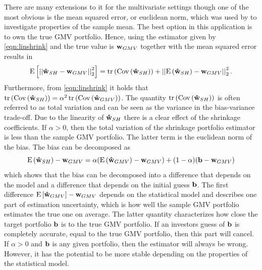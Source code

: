 \documentclass[12pt, oneside]{book}\usepackage{knitr}
\begin{document}
There are many extensions to it for the multivariate settings though one of the most obvious is the mean squared error, or euclidean norm, which was used by 
\citet{stein1956} to investigate properties of the sample mean.  
The best option in this application is to own the true GMV portfolio.
Hence, using the estimator given by \eqref{eqn:linshrink} and the true value is $\mathbf{w}_{GMV}$ together with the mean squared error results in
\begin{align*}
  \operatorname{E}\left[\left|\left|\mathbf{\hat{w}}_{SH} - \mathbf{w}_{GMV}\right|\right|^2_2\right] 
  & = \operatorname{tr}\left(\operatorname{Cov}\left(\mathbf{\hat{w}}_{SH}\right)\right) + \left|\left|\operatorname{E}\left(\mathbf{\hat{w}}_{SH}\right) - \mathbf{w}_{GMV}\right|\right|^2_2. \\ 
\end{align*}
Furthermore, from \eqref{eqn:linshrink} it holds that $\operatorname{tr}\left(\operatorname{Cov}\left(\mathbf{\hat{w}}_{SH}\right)\right) = \alpha^2 \operatorname{tr}\left(\operatorname{Cov}\left(\mathbf{\hat{w}}_{GMV}\right)\right)$.
The quantity $\operatorname{tr}\left(\operatorname{Cov}\left(\mathbf{\hat{w}}_{SH}\right)\right)$ is often referred to as total variation and can be seen as the variance in the bias-variance trade-off. 
Due to the linearity of $\mathbf{\hat{w}}_{SH}$ there is a clear effect of the shrinkage coefficients.
If $\alpha>0$, then the total variation of the shrinkage portfolio estimator is less than the sample GMV portfolio.
The latter term is the euclidean norm of the bias.
The bias can be decomposed as
$$
\operatorname{E}\left(\mathbf{\hat{w}}_{SH}\right) - \mathbf{w}_{GMV} = \alpha (\operatorname{E}\left(\mathbf{\hat{w}}_{GMV}\right) - \mathbf{w}_{GMV}) + (1-\alpha) (\mathbf{b} - \mathbf{w}_{GMV})
$$
which shows that the bias can be decomposed into a difference that depends on the model and a difference that depends on the initial guess $\mathbf{b}$.
The first difference $\operatorname{E}\left[\mathbf{\hat{w}}_{GMV}\right] - \mathbf{w}_{GMV}$ depends on the statistical model and describes one part of estimation uncertainty, which is how well the sample GMV portfolio estimates the true one on average.
The latter quantity characterizes how close the target portfolio $\mathbf{b}$ is to the true GMV portfolio. 
If an investors guess of $\mathbf{b}$ is completely accurate, equal to the true GMV portfolio, then this part will cancel.
If $\alpha>0$ and $\mathbf{b}$ is any given portfolio, then the estimator will always be wrong. 
However, it has the potential to be more stable depending on the properties of the statistical model.
\end{document}
